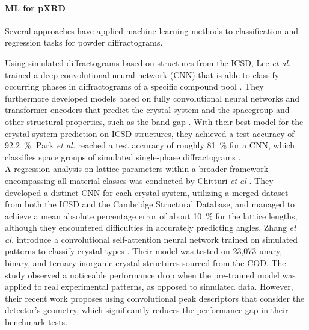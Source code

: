 
\paragraph{ML for pXRD}
Several approaches have applied machine learning methods to classification and regression tasks for powder diffractograms.

Using simulated diffractograms based on structures from the ICSD, Lee {\it et al.} trained a deep convolutional neural network (CNN) that is able to classify occurring phases in diffractograms of a specific compound pool \cite{Lee2020}. They furthermore developed models based on fully convolutional neural networks and transformer encoders that predict the crystal system and the spacegroup and other structural properties, such as the band gap \cite{Lee2022}. With their best model for the crystal system prediction on ICSD structures, they achieved a test accuracy of \SI{92.2}{\percent}. Park {\it et al.} reached a test accuracy of roughly \SI{81}{\percent} for a CNN, which classifies space groups of simulated single-phase diffractograms \cite{Park2017}. \\

A regression analysis on lattice parameters within a broader framework encompassing all material classes was conducted by Chitturi {\it et al} \cite{Chitturi2021}. They developed a distinct CNN for each crystal system, utilizing a merged dataset from both the ICSD and the Cambridge Structural Database, and managed to achieve a mean absolute percentage error of about \SI{10}{\percent} for the lattice lengths, although they encountered difficulties in accurately predicting angles.
Zhang {\it et al.} introduce a convolutional self-attention neural network trained on simulated patterns to classify crystal types \cite{zhang2024crystallographic}. Their model was tested on 23,073 unary, binary, and ternary inorganic crystal structures sourced from the COD. The study observed a noticeable performance drop when the pre-trained model was applied to real experimental patterns, as opposed to simulated data. However, their recent work \cite{cao2024simxrd} proposes using convolutional peak descriptors that consider the detector's geometry, which significantly reduces the performance gap in their benchmark tests.\\

